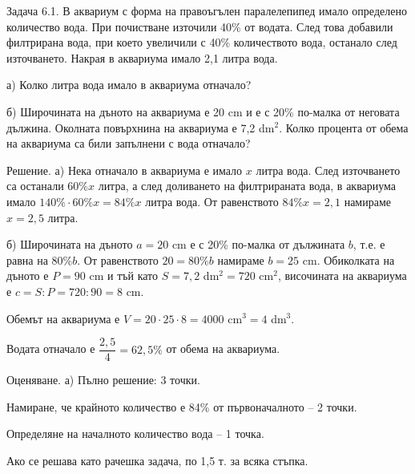 
Задача 6.1. В аквариум с форма на правоъгълен паралелепипед имало определено количество вода. При почистване източили 40\% от водата. След това добавили филтрирана вода, при което увеличили с 40\% количеството вода, останало след източването. Накрая в аквариума имало 2,1 литра вода.

а) Колко литра вода имало в аквариума отначало?

б) Широчината на дъното на аквариума е 20 cm и е с 20\% по-малка от неговата дължина. Околната повърхнина на аквариума е 7,2 dm$^2$. Колко процента от обема на аквариума са били запълнени с вода отначало?

Решение. а) Нека отначало в аквариума е имало $x$ литра вода. След източването са останали $60\%x$ литра, а след доливането на филтрираната вода, в аквариума имало $140\%\cdot60\%x=84\%x$ литра вода. От равенството $84\%x=2,1$ намираме $x=2,5$ литра.

б) Широчината на дъното $a=20$ cm е с 20\% по-малка от дължината $b$, т.е. е равна на $80\%b$. От равенството $20=80\%b$ намираме $b=25$ cm. Обиколката на дъното е $P=90$ cm и тъй като $S=7,2$ dm$^2=720$ cm$^2$, височината на аквариума е $c=S:P=720:90=8$ cm.

Обемът на аквариума е $V=20\cdot25\cdot8=4000$ cm$^3=4$ dm$^3$.

Водата отначало е $\dfrac{2,5}{4}=62,5\%$ от обема на аквариума.

Оценяване. а) Пълно решение: 3 точки.

Намиране, че крайното количество е 84\% от първоначалното – 2 точки.

Определяне на началното количество вода – 1 точка.

Ако се решава като рачешка задача, по 1,5 т. за всяка стъпка.

